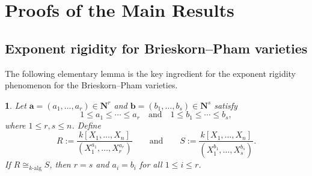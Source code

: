 \documentclass[10pt,a4paper]{amsart}
\numberwithin{equation}{section}
\numberwithin{figure}{section}
\newtheorem{lem}[thm]{\protect\lemmaname}
\providecommand{\lemmaname}{Lemma}
\numberwithin{equation}{section}
\newcommand{\N}{\mathbf{N}}
\newcommand{\ba}{\mathbf{a}}
\newcommand{\bb}{\mathbf{b}}
\begin{document}
\section{\bf Proofs of the Main Results}\label{se3}
\subsection{Exponent rigidity for Brieskorn--Pham varieties}\label{subse3.1}
The following elementary lemma is the key ingredient for the exponent rigidity phenomenon for the Brieskorn--Pham varieties.

\begin{lem}\label{Lem: Key Lemma}
Let $\ba=(a_1,\ldots,a_r)\in\N^r$ and $\bb=(b_1,\ldots,b_s)\in\N^s$ satisfy
\[
1\le a_1\le \cdots\le a_r
\quad\text{and}\quad
1\le b_1\le \cdots\le b_s,
\]
where $1\leq r,s\le n$. Define
\[
R:=\frac{k[X_1,\ldots,X_n]}{(X_1^{a_1},\ldots,X_r^{a_r})}
\qquad\text{and}\qquad
S:=\frac{k[X_1,\ldots,X_n]}{(X_1^{b_1},\ldots,X_s^{b_s})}.
\]
If $R\cong_{k\text{-alg}} S$, then $r=s$ and $a_i=b_i$ for all $1\le i\le r$.
\end{lem}
\end{document}
